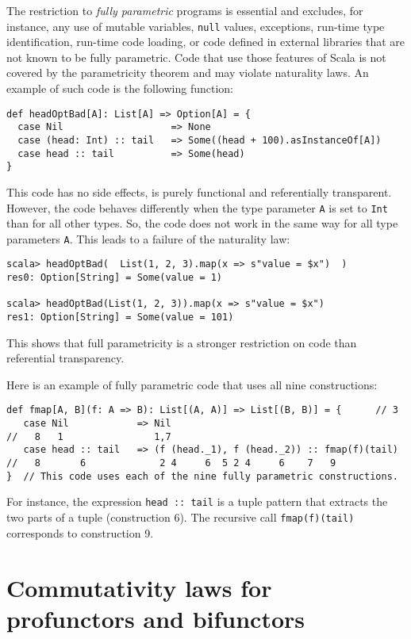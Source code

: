The restriction to \emph{fully parametric} programs
is essential and excludes, for instance, any use of mutable variables,
\lstinline!null! values, exceptions, run-time type identification,
run-time code loading, or code defined in external libraries that
are not known to be fully parametric. Code that use those features
of Scala is not covered by the parametricity theorem and may violate
naturality laws. An example of such code is the following function:
\begin{lstlisting}
def headOptBad[A]: List[A] => Option[A] = {
  case Nil                   => None
  case (head: Int) :: tail   => Some((head + 100).asInstanceOf[A])
  case head :: tail          => Some(head)
}
\end{lstlisting}
This code has no side effects, is purely functional and referentially
transparent. However, the code behaves differently when the type parameter
\lstinline!A! is set to \lstinline!Int! than for all other types.
So, the code does not work in the same way for all type parameters
\lstinline!A!. This leads to a failure of the naturality law:
\begin{lstlisting}
scala> headOptBad(  List(1, 2, 3).map(x => s"value = $x")  )
res0: Option[String] = Some(value = 1)

scala> headOptBad(List(1, 2, 3)).map(x => s"value = $x")
res1: Option[String] = Some(value = 101)
\end{lstlisting}
This shows that full parametricity is a stronger restriction on code
than referential transparency.

Here is an example of fully parametric code that uses all nine constructions:
\begin{lstlisting}
def fmap[A, B](f: A => B): List[(A, A)] => List[(B, B)] = {      // 3
   case Nil            => Nil
//   8   1                1,7 
   case head :: tail   => (f (head._1), f (head._2)) :: fmap(f)(tail)
//   8       6             2 4     6  5 2 4     6    7   9
}  // This code uses each of the nine fully parametric constructions.
\end{lstlisting}
For instance, the expression \lstinline!head :: tail! is a tuple
pattern that extracts the two parts of a tuple (construction 6). The
recursive call \lstinline!fmap(f)(tail)! corresponds to construction
9.

\section{Commutativity laws for profunctors and bifunctors\label{sec:Commutativity-laws-for-type-constructors}}


